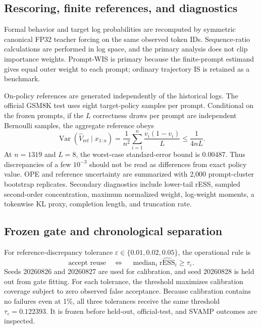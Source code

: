 \documentclass[10pt]{article}
\theoremstyle{remark}
\newcommand{\Var}{\operatorname{Var}}
\newcommand{\rESS}{\mathrm{rESS}}
\begin{document}
\subsection{Rescoring, finite references, and diagnostics}
Formal behavior and target log probabilities are recomputed by symmetric canonical FP32 teacher forcing on the same observed token IDs. Sequence-ratio calculations are performed in log space, and the primary analysis does not clip importance weights. Prompt-WIS is primary because the finite-prompt estimand gives equal outer weight to each prompt; ordinary trajectory IS is retained as a benchmark.

On-policy references are generated independently of the historical logs. The official GSM8K test uses eight target-policy samples per prompt. Conditional on the frozen prompts, if the $L$ correctness draws per prompt are independent Bernoulli samples, the aggregate reference obeys
\begin{equation}
\Var(\widehat V_{\mathrm{ref}}\mid x_{1:n})
=\frac1{n^2}\sum_{i=1}^{n}\frac{v_i(1-v_i)}{L}\le \frac1{4nL}.
\end{equation}
At $n=1319$ and $L=8$, the worst-case standard-error bound is 0.00487. Thus discrepancies of a few $10^{-3}$ should not be read as differences from exact policy value. OPE and reference uncertainty are summarized with 2,000 prompt-cluster bootstrap replicates. Secondary diagnostics include lower-tail rESS, sampled second-order concentration, maximum normalized weight, log-weight moments, a tokenwise KL proxy, completion length, and truncation rate.

\subsection{Frozen gate and chronological separation}
For reference-discrepancy tolerance $\varepsilon\in\{0.01,0.02,0.05\}$, the operational rule is
\begin{equation}
\text{accept reuse}\quad\Longleftrightarrow\quad \operatorname{median}_i\widehat{\rESS}_i\ge\tau_\varepsilon.
\end{equation}
Seeds 20260826 and 20260827 are used for calibration, and seed 20260828 is held out from gate fitting. For each tolerance, the threshold maximizes calibration coverage subject to zero observed false acceptance. Because calibration contains no failures even at 1\%, all three tolerances receive the same threshold $\tau_\varepsilon=0.122393$. It is frozen before held-out, official-test, and SVAMP outcomes are inspected.
\end{document}
